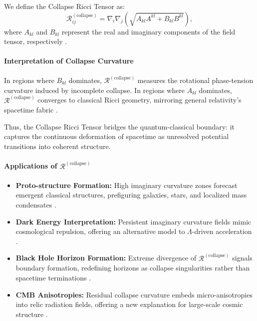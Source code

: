 We define the Collapse Ricci Tensor as:
\[
\mathcal{R}^{(\text{collapse})}_{ij} = \nabla_i \nabla_j \left( \sqrt{A_{kl} A^{kl} + B_{kl} B^{kl}} \right),
\]
where $A_{kl}$ and $B_{kl}$ represent the real and imaginary components of the field tensor, respectively \cite{arnold1989mathematical}.

\paragraph{Interpretation of Collapse Curvature}
In regions where $B_{kl}$ dominates, $\mathcal{R}^{(\text{collapse})}$ measures the rotational phase-tension curvature induced by incomplete collapse.  
In regions where $A_{kl}$ dominates, $\mathcal{R}^{(\text{collapse})}$ converges to classical Ricci geometry, mirroring general relativity's spacetime fabric \cite{dirac1930principles, vonNeumann1932mathQM}.

Thus, the Collapse Ricci Tensor bridges the quantum-classical boundary: it captures the continuous deformation of spacetime as unresolved potential transitions into coherent structure.

\paragraph{Applications of $\mathcal{R}^{(\text{collapse})}$}

\begin{itemize}
    \item \textbf{Proto-structure Formation:} High imaginary curvature zones forecast emergent classical structures, prefiguring galaxies, stars, and localized mass condensates \cite{hd140283_star}.
    \item \textbf{Dark Energy Interpretation:} Persistent imaginary curvature fields mimic cosmological repulsion, offering an alternative model to $\Lambda$-driven acceleration \cite{grb_redshift_observation}.
    \item \textbf{Black Hole Horizon Formation:} Extreme divergence of $\mathcal{R}^{(\text{collapse})}$ signals boundary formation, redefining horizons as collapse singularities rather than spacetime terminations \cite{wigner1963measurement}.
    \item \textbf{CMB Anisotropies:} Residual collapse curvature embeds micro-anisotropies into relic radiation fields, offering a new explanation for large-scale cosmic structure \cite{grb_redshift_dependence}.
\end{itemize}

